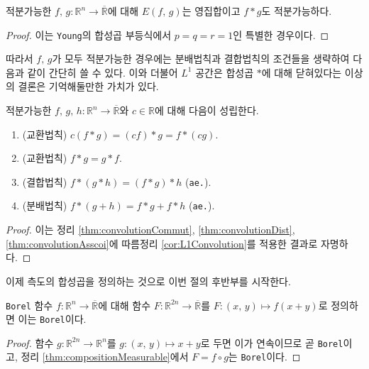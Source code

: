 \begin{corollary}\label{cor:L1Convolution}
    적분가능한 $f,\,g:\mathbb{R}^n\to\overline{\mathbb{R}}$에 대해 $E(f,\,g)$는 영집합이고 $f*g$도 적분가능하다.
\end{corollary}

\begin{proof}
    이는 \texttt{Young}의 합성곱 부등식에서 $p=q=r=1$인 특별한 경우이다.
\end{proof}

따라서 $f,\,g$가 모두 적분가능한 경우에는 분배법칙과 결합법칙의 조건들을 생략하여 다음과 같이 간단히 쓸 수 있다. 이와 더불어 $L^1$ 공간은 합성곱 $*$에 대해 닫혀있다는 이상의 결론은 기억해둘만한 가치가 있다.

\begin{corollary}
    적분가능한 $f,\,g,\,h:\mathbb{R}^n\to\overline{\mathbb{R}}$와 $c\in\mathbb{R}$에 대해 다음이 성립한다.
    \begin{enumerate}
        \item (교환법칙) $c(f*g)=(cf)*g=f*(cg)$.
        \item (교환법칙) $f*g=g*f$.
        \item (결합법칙) $f*(g*h)=(f*g)*h$ (\texttt{ae.}).
        \item (분배법칙) $f*(g+h)=f*g+f*h$ (\texttt{ae.}).
    \end{enumerate}
\end{corollary}

\begin{proof}
    이는 정리 \ref{thm:convolutionCommut}, \ref{thm:convolutionDist}, \ref{thm:convolutionAsscoi}에 따름정리 \ref{cor:L1Convolution}를 적용한 결과로 자명하다.
\end{proof}

이제 측도의 합성곱을 정의하는 것으로 이번 절의 후반부를 시작한다.

\begin{proposition}\label{prop:convolutionMeasurable2}
    \texttt{Borel} 함수 $f:\mathbb{R}^n\to\overline{\mathbb{R}}$에 대해 함수 $F:\mathbb{R}^{2n}\to\overline{\mathbb{R}}$를 $F:(x,\,y)\mapsto f(x+y)$로 정의하면 이는 \texttt{Borel}이다.
\end{proposition}

\begin{proof}
    함수 $g:\mathbb{R}^{2n}\to\mathbb{R}^n$를 $g:(x,\,y)\mapsto x+y$로 두면 이가 연속이므로 곧 \texttt{Borel}이고, 정리 \ref{thm:compositionMeasurable}에서 $F=f\circ g$는 \texttt{Borel}이다.
\end{proof}


